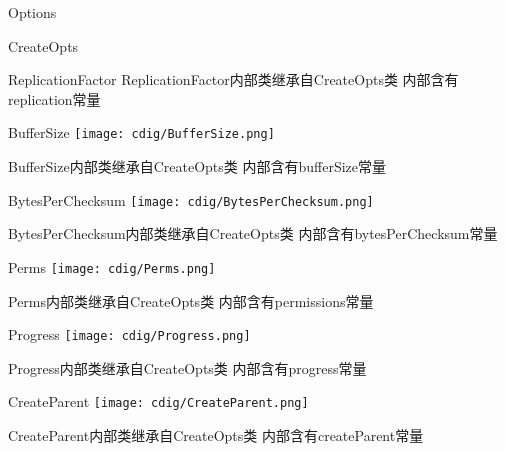 \begin{XeClass}{Options}
\begin{XeInnerClass}{CreateOpts}
\begin{XeInnerClass}{ReplicationFactor}
 ReplicationFactor内部类继承自CreateOpts类
 内部含有replication常量

        \end{XeInnerClass}
        \begin{XeInnerClass}{BufferSize}
\texttt{[image: cdig/BufferSize.png]}
             
 BufferSize内部类继承自CreateOpts类
 内部含有bufferSize常量

        \end{XeInnerClass}
        \begin{XeInnerClass}{BytesPerChecksum}
\texttt{[image: cdig/BytesPerChecksum.png]}
             
 BytesPerChecksum内部类继承自CreateOpts类
 内部含有bytesPerChecksum常量

        \end{XeInnerClass}
        \begin{XeInnerClass}{Perms}
\texttt{[image: cdig/Perms.png]}
             
 Perms内部类继承自CreateOpts类
 内部含有permissions常量

        \end{XeInnerClass}
        \begin{XeInnerClass}{Progress}
\texttt{[image: cdig/Progress.png]}
             
 Progress内部类继承自CreateOpts类
 内部含有progress常量

        \end{XeInnerClass}
        \begin{XeInnerClass}{CreateParent}
\texttt{[image: cdig/CreateParent.png]}
             
 CreateParent内部类继承自CreateOpts类
 内部含有createParent常量

        \end{XeInnerClass}
    \end{XeInnerClass}
\end{XeClass}
